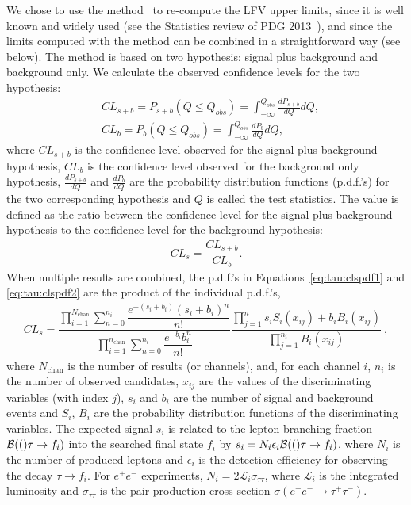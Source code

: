 We chose to use the \cls method~\cite{Mistlberger:2012rs} to re-compute the
\mtau LFV upper limits, since it is well known and widely used (see the
Statistics review of PDG 2013~\cite{PDG_2012}), and since the
limits computed with the \cls method can be combined in a straightforward
way (see below). The \cls method is based on two hypothesis: signal plus background and
background only. We calculate the observed confidence levels for the two
hypothesis:
\begin{align}
&CL_{s+b} = P_{s+b}(Q \leq Q_{obs}) = \int_{- \infty}^{Q_{obs}} \frac{dP_{s+b}}{dQ} dQ,
\label{eq:tau:clspdf1} \\
&CL_{b} = P_{b}(Q \leq Q_{obs}) = \int_{- \infty}^{Q_{obs}} \frac{dP_{b}}{dQ} dQ,
\label{eq:tau:clspdf2}
\end{align}
where $CL_{s+b}$ is the confidence level observed for the signal plus background
hypothesis, $CL_{b}$ is the confidence level observed for the background only
hypothesis, $\frac{dP_{s+b}}{dQ}$ and $\frac{dP_{b}}{dQ}$ are the probability
distribution functions (p.d.f.'s) for the two corresponding hypothesis and
$Q$ is called the test statistics. The \cls value is defined as the ratio
between the confidence level for the signal plus background hypothesis to
the confidence level for the background hypothesis:
\begin{align*}
CL_s=\dfrac{CL_{s+b}}{CL_{b}}.
\end{align*}
When multiple results are combined, the p.d.f.'s in
Equations~\ref{eq:tau:clspdf1} and \ref{eq:tau:clspdf2} are the
product of the individual p.d.f.'s,
\begin{align*}
CL_s = \dfrac{\prod_{i=1}^{N_{\text{chan}}}\sum_{n=0}^{n_i} \dfrac{e^{-(s_i+b_i)} (s_i+b_i)^{n}}{n!} }{\prod_{i=1}^{n_{\text{chan}}}  \sum_{n=0}^{n_i} \dfrac{e^{-b_i} b_i^{n}}{n!}}    \dfrac{\prod_{j=1}^{n} s_iS_i(x_{ij})+b_iB_i(x_{ij})}{\prod_{j=1}^{n_i}B_i(x_{ij})}~,
\end{align*}
where $N_{\text{chan}}$ is the number of results (or channels), and, for each channel $i$,
$n_i$ is the number of observed candidates, $x_{ij}$ are the values of the
discriminating variables (with index $j$), $s_i$ and $b_i$ are the number
of signal and background events and $S_i$, $B_i$ are the probability
distribution functions of the discriminating variables.
The expected signal $s_i$ is related to the \mtau lepton branching
fraction ${\cal B}(()\tau \rightarrow f_i)$ into
the searched final state $f_i$ by $s_i = N_i\epsilon_i{\cal B}(()\tau \rightarrow
f_i)$, where $N_i$ is the number of produced \mtau leptons and
$\epsilon_i$ is the detection efficiency for observing the decay $\tau\to
f_i$. For $e^+ e^-$ experiments,
$N_i = 2\mathcal{L}_i\sigma_{\tau\tau}$, where $\mathcal{L}_i$ is the
integrated luminosity and $\sigma_{\tau\tau}$ is the
\mtau pair production cross section $\sigma(e^+ e^- \rightarrow \tau^+ \tau^-)$.

